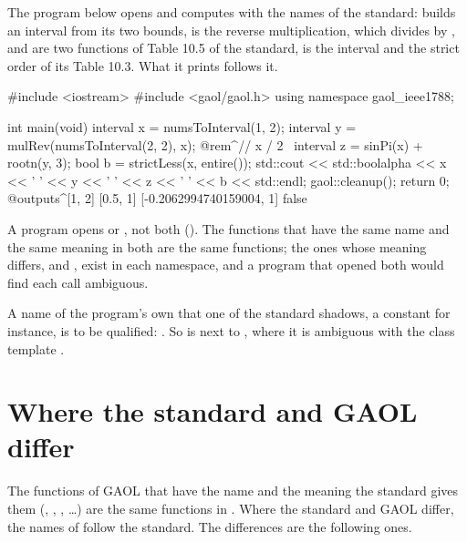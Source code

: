 \documentclass[12pt,a4paper,twoside,openright]{book}
\begin{document}
\begin{Ex}\label{ex:ieee1788-program}
The program below opens  and computes with the names of
the standard:  builds an interval from its two bounds,
 is the reverse multiplication, which divides  by
,  and  are two functions of Table 10.5 of
the standard,  is the interval \itv{-\infty}{+\infty} and
 the strict order of its Table 10.3. What it prints
follows it.
\begin{example}
#include <iostream>
#include <gaol/gaol.h>
using namespace gaol_ieee1788;

int main(void)
{
  interval x = numsToInterval(1, 2);
  interval y = mulRev(numsToInterval(2, 2), x);   @rem^// x / 2~
  interval z = sinPi(x) + rootn(y, 3);
  bool b = strictLess(x, entire());
  std::cout << std::boolalpha
            << x << ' ' << y << ' ' << z << ' ' << b << std::endl;
  gaol::cleanup();
  return 0;
}
@outputs^[1, 2] [0.5, 1] [-0.2062994740159004, 1] false~
\end{example}
\end{Ex}

\medskip
\noindent
A program opens  or , not both
(). The functions that have the same name and the same
meaning in both are the same functions; the ones whose meaning differs,
 and , exist in each namespace, and a program
that opened both would find each call ambiguous.

\begin{Rem}\label{rem:ieee1788-shadow}
A name of the program's own that one of the standard shadows, a constant
 for instance, is to be qualified: .
So is  next to , where it is
ambiguous with the class template .
\end{Rem}

\section{Where the standard and GAOL differ}\label{sec:ieee1788-differences}
%

The functions of GAOL that have the name and the meaning the standard gives
them (, , , \ldots) are the same
functions in . Where the standard and GAOL differ, the
names of  follow the standard. The differences are the
following ones.
\end{document}
